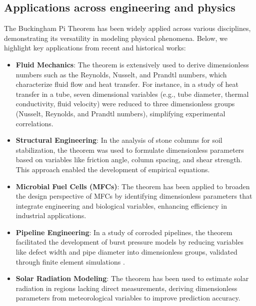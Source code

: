 \subsection{Applications across engineering and physics}

The Buckingham Pi Theorem has been widely applied across various disciplines, demonstrating its versatility in modeling physical phenomena. Below, we highlight key applications from recent and historical works:

\begin{itemize}
    \item \textbf{Fluid Mechanics}: The theorem is extensively used to derive dimensionless numbers such as the Reynolds, Nusselt, and Prandtl numbers, which characterize fluid flow and heat transfer. For instance, in a study of heat transfer in a tube, seven dimensional variables (e.g., tube diameter, thermal conductivity, fluid velocity) were reduced to three dimensionless groups (Nusselt, Reynolds, and Prandtl numbers), simplifying experimental correlations.

    \item \textbf{Structural Engineering}: In the analysis of stone columns for soil stabilization, the theorem was used to formulate dimensionless parameters based on variables like friction angle, column spacing, and shear strength. This approach enabled the development of empirical equations.

    \item \textbf{Microbial Fuel Cells (MFCs)}: The theorem has been applied to broaden the design perspective of MFCs by identifying dimensionless parameters that integrate engineering and biological variables, enhancing efficiency in industrial applications.
\end{itemize}
\begin{itemize}
    \item \textbf{Pipeline Engineering}: In a study of corroded pipelines, the theorem facilitated the development of burst pressure models by reducing variables like defect width and pipe diameter into dimensionless groups, validated through finite element simulations \cite{AmayaGomez2019}.

    \item \textbf{Solar Radiation Modeling}: The theorem has been used to estimate solar radiation in regions lacking direct measurements, deriving dimensionless parameters from meteorological variables to improve prediction accuracy.
\end{itemize}

